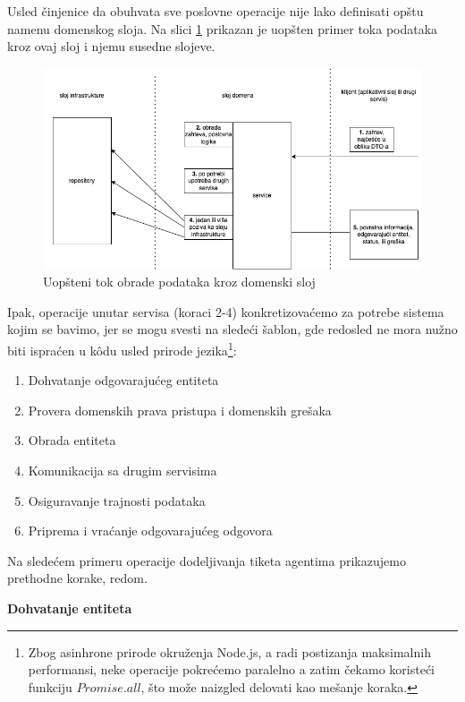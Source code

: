 \documentclass[12pt,oneside]{memoir}
\begin{document}
Usled činjenice da obuhvata sve poslovne operacije nije lako definisati opštu namenu domenskog sloja. Na slici \ref{fig:domainlayerdiagram} prikazan je uopšten primer toka podataka kroz ovaj sloj i njemu susedne slojeve.

\begin{figure}[h]
  \centering
  \includegraphics[width=1\textwidth]{docs/images/ch_2/domain.png} 
  \caption{Uopšteni tok obrade podataka kroz domenski sloj}
  \label{fig:domainlayerdiagram}
\end{figure}

Ipak, operacije unutar servisa (koraci 2-4) konkretizovaćemo za potrebe sistema kojim se bavimo, jer se mogu svesti na sledeći šablon, gde redosled ne mora nužno biti ispraćen u k\^{o}du usled prirode jezika\footnote{Zbog asinhrone prirode okruženja Node.js, a radi postizanja maksimalnih performansi, neke operacije pokrećemo paralelno a zatim čekamo koristeći funkciju $Promise.all$, što može naizgled delovati kao mešanje koraka.}:

\begin{enumerate}
  \item Dohvatanje odgovarajućeg entiteta
  \item Provera domenskih prava pristupa i domenskih grešaka
  \item Obrada entiteta
  \item Komunikacija sa drugim servisima
  \item Osiguravanje trajnosti podataka
  \item Priprema i vraćanje odgovarajućeg odgovora
\end{enumerate}

Na sledećem primeru operacije dodeljivanja tiketa agentima prikazujemo prethodne korake, redom.

\textbf{Dohvatanje entiteta}
\end{document}
